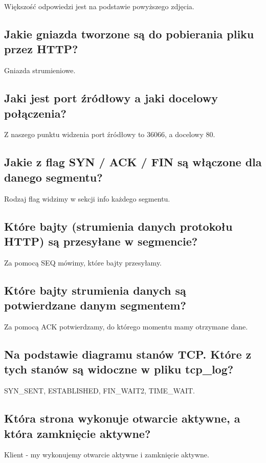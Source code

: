 \documentclass{article}
\begin{document}
Większość odpowiedzi jest na podstawie powyższego zdjęcia.

\subsection{Jakie gniazda tworzone są do pobierania pliku przez HTTP?}
Gniazda strumieniowe.
\subsection{Jaki jest port źródłowy a jaki docelowy połączenia?}
Z naszego punktu widzenia port źródłowy to 36066, a docelowy 80.
\subsection{Jakie z flag SYN / ACK / FIN są włączone dla danego segmentu?}
Rodzaj flag widzimy w sekcji info każdego segmentu.
\subsection{Które bajty (strumienia danych protokołu HTTP) są przesyłane w segmencie?}
Za pomocą SEQ mówimy, które bajty przesyłamy.
\subsection{Które bajty strumienia danych są potwierdzane danym segmentem?}
Za pomocą ACK potwierdzamy, do którego momentu mamy otrzymane dane.
\subsection{Na podstawie diagramu stanów TCP. Które z tych stanów są widoczne w pliku tcp\_log?}
SYN\_SENT, ESTABLISHED, FIN\_WAIT2, TIME\_WAIT.
\subsection{Która strona wykonuje otwarcie aktywne, a która zamknięcie aktywne?}
Klient - my wykonujemy otwarcie aktywne i zamknięcie aktywne.
\end{document}
